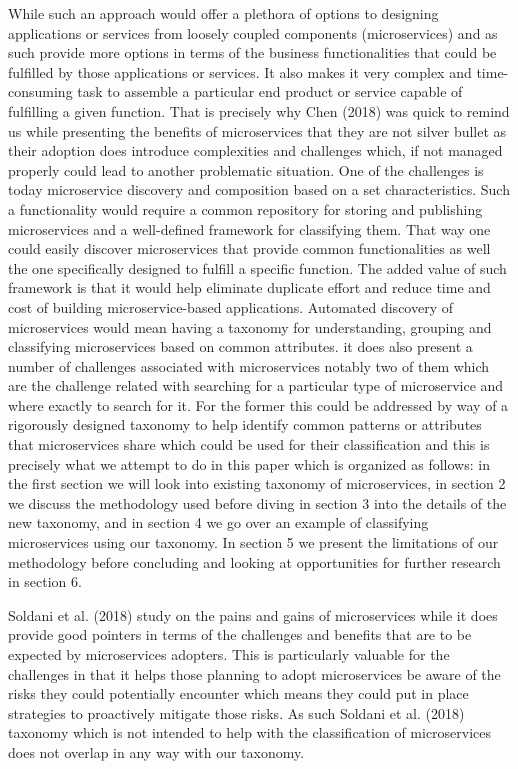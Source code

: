 \documentclass{article}
\begin{document}
While such an approach would offer a plethora of options to designing applications or services from loosely coupled components (microservices) and as such provide more options in terms of the business functionalities that could be fulfilled by those applications or services. It also makes it very complex and time-consuming task to assemble a particular end product or service capable of fulfilling a given function. That is precisely why Chen (2018) was quick to remind us while presenting the benefits of microservices that they are not silver bullet as their adoption does introduce complexities and challenges which, if not managed properly could lead to another problematic situation. One of the challenges is today microservice discovery and composition based on a set characteristics. Such a functionality would require a common repository for storing and publishing microservices and a well-defined framework for classifying them. That way one could easily discover microservices that provide common functionalities as well the one specifically designed to fulfill a specific function. The added value of such framework is that it would help eliminate duplicate effort and reduce time and cost of building microservice-based applications. Automated discovery of microservices would mean having a taxonomy for understanding, grouping and classifying microservices based on common attributes. it does also present a number of challenges associated with microservices notably two of them which are the challenge related with searching for a particular type of microservice and where exactly to search for it. For the former this could be addressed by way of a rigorously designed taxonomy to help identify common patterns or attributes that microservices share which could be used for their classification and this is precisely what we attempt to do in this paper which is organized as follows: in the first section we will look into existing taxonomy of microservices, in section 2 we discuss the methodology used before diving in section 3 into the details of the new taxonomy, and in section 4 we go over an example of classifying microservices using our taxonomy. In section 5 we present the limitations of our methodology before concluding and looking at opportunities for further research in section 6.

Soldani et al. (2018) study on the pains and gains of microservices while it does provide good pointers in terms of the challenges and benefits that are to be expected by microservices adopters. This is particularly valuable for the challenges in that it helps those planning to adopt microservices be aware of the risks they could potentially encounter which means they could put in place strategies to proactively mitigate those risks. As such Soldani et al. (2018) taxonomy which is not intended to help with the classification of microservices does not overlap in any way with our taxonomy. 
\end{document}
